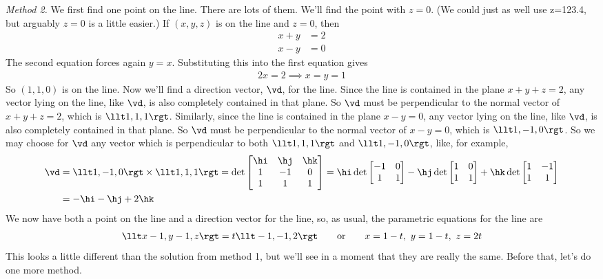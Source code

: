 \begin{eg}
\smallskip
\noindent\emph{Method 2.} We first find one point on the line. There
are lots of them. We'll find the point with $z=0$. (We could just as well
use z=123.4, but arguably $z=0$ is a little easier.) If  $(x,y,z)$ is 
on the line and $z=0$, then
\begin{align*}
x+y&=2\\
x-y&=0
\end{align*}
The second equation forces again $y=x$. Substituting this into the first 
equation gives
\begin{align*}
2x=2 \implies x=y=1
\end{align*}
So $(1,1,0)$ is on the line. Now we'll find a direction vector, $\vd$,
for the line. Since the line is contained in the plane $x+y+z=2$,
any vector lying on the line, like $\vd$, is also completely contained
in that plane. So $\vd$ must be perpendicular to the normal vector of
$x+y+z=2$, which is $\llt 1,1,1\rgt $. Similarly, since the line is 
contained in the plane $x-y=0$, any vector lying on the line, like $\vd$, is also completely contained in that plane.  So $\vd$ must be perpendicular to 
the normal vector of $x-y=0$, which is $\llt 1,-1,0\rgt $. So we may choose for
$\vd$ any vector which is perpendicular to both $\llt 1,1,1\rgt $ and 
$\llt 1,-1,0\rgt$, like, for example,
\begin{align*}
\vd&=\llt 1,-1,0\rgt \times\llt 1,1,1\rgt 
=\det\left[ \begin{matrix}\hi &\hj&\hk\\ 1&-1&0\\ 1&1&1\end{matrix}\right]
=\hi\det\left[\begin{matrix}-1&0\\1&1\end{matrix}\right]
-\hj\det\left[\begin{matrix}1&0\\ 1&1\end{matrix}\right]
+\hk\det\left[\begin{matrix}1&-1\\ 1&1\end{matrix}\right]\\
&=-\hi-\hj+2\hk
\end{align*}
We now have both a point on the line and a direction vector for the line,
so, as usual, the parametric equations for the line are
\begin{align*}
\llt x-1,y-1,z\rgt =t\llt -1,-1,2\rgt \qquad\text{or}\qquad
x=1-t,\ y=1-t,\ z=2t
\end{align*}
This looks a little different than the solution from method 1, but we'll see in a moment that they are really the same. Before that, let's do one more method. 


\end{eg}
